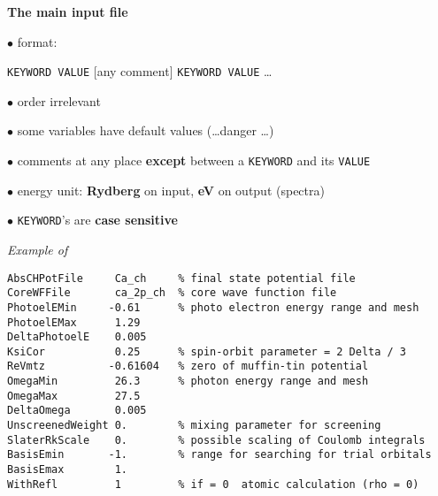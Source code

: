 \documentclass[landscape]{slides}
\begin{document}
\begin{slide}
{\bf The main input file} 

$\bullet$ format:

{\tt KEYWORD VALUE}  [any comment] {\tt KEYWORD VALUE} \dots

$\bullet$ order irrelevant

$\bullet$ some variables have default values  (\dots danger \dots)

$\bullet$ comments at any place
{\bf except}
 between a {\tt KEYWORD} and its {\tt VALUE}

$\bullet$ energy unit: {\bf Rydberg} on input,
{\bf eV} on output (spectra)

$\bullet$ {\tt KEYWORD}'s are {\bf case sensitive} 

\end{slide}
\begin{slide}
{\it Example of} 
\begin{verbatim}
AbsCHPotFile     Ca_ch     % final state potential file
CoreWFFile       ca_2p_ch  % core wave function file    
PhotoelEMin     -0.61      % photo electron energy range and mesh
PhotoelEMax      1.29
DeltaPhotoelE    0.005
KsiCor           0.25      % spin-orbit parameter = 2 Delta / 3
ReVmtz          -0.61604   % zero of muffin-tin potential
OmegaMin         26.3      % photon energy range and mesh
OmegaMax         27.5
DeltaOmega       0.005
UnscreenedWeight 0.        % mixing parameter for screening
SlaterRkScale    0.        % possible scaling of Coulomb integrals
BasisEmin       -1.        % range for searching for trial orbitals
BasisEmax        1.
WithRefl         1         % if = 0  atomic calculation (rho = 0)
\end{verbatim}

\end{slide}
\end{document}
